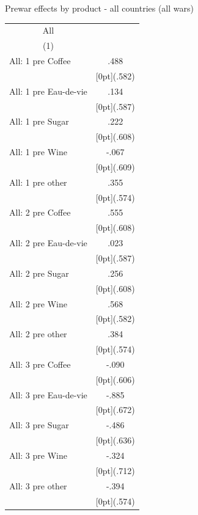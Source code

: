 \documentclass[12pt,a4paper,titlepage]{article}
\begin{document}
{\newpage
\caption{Prewar effects by product - all countries (all wars)}
\begin{tabular*}{\textwidth}{@{\extracolsep{\fill}}lc}	
	\multicolumn{1}{c}{All} \\
\cline{2-2}	
	\multicolumn{1}{c}{(1)} \\
\hline	
All: 1 pre Coffee &	.488 \\
&	\raisebox{.7ex}[0pt]{\scriptsize (.582)} \\
All: 1 pre Eau-de-vie &	.134 \\
&	\raisebox{.7ex}[0pt]{\scriptsize (.587)} \\
All: 1 pre Sugar &	.222 \\
&	\raisebox{.7ex}[0pt]{\scriptsize (.608)} \\
All: 1 pre Wine &	-.067 \\
&	\raisebox{.7ex}[0pt]{\scriptsize (.609)} \\
All: 1 pre other &	.355 \\
&	\raisebox{.7ex}[0pt]{\scriptsize (.574)} \\
All: 2 pre Coffee &	.555 \\
&	\raisebox{.7ex}[0pt]{\scriptsize (.608)} \\
All: 2 pre Eau-de-vie &	.023 \\
&	\raisebox{.7ex}[0pt]{\scriptsize (.587)} \\
All: 2 pre Sugar &	.256 \\
&	\raisebox{.7ex}[0pt]{\scriptsize (.608)} \\
All: 2 pre Wine &	.568 \\
&	\raisebox{.7ex}[0pt]{\scriptsize (.582)} \\
All: 2 pre other &	.384 \\
&	\raisebox{.7ex}[0pt]{\scriptsize (.574)} \\
All: 3 pre Coffee &	-.090 \\
&	\raisebox{.7ex}[0pt]{\scriptsize (.606)} \\
All: 3 pre Eau-de-vie &	-.885 \\
&	\raisebox{.7ex}[0pt]{\scriptsize (.672)} \\
All: 3 pre Sugar &	-.486 \\
&	\raisebox{.7ex}[0pt]{\scriptsize (.636)} \\
All: 3 pre Wine &	-.324 \\
&	\raisebox{.7ex}[0pt]{\scriptsize (.712)} \\
All: 3 pre other &	-.394 \\
&	\raisebox{.7ex}[0pt]{\scriptsize (.574)} \\

\end{tabular*}}
\end{document}
